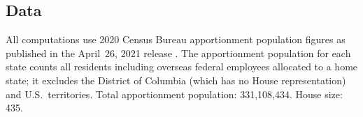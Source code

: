\subsection{Data}

All computations use 2020 Census Bureau apportionment population figures
as published in the April~26, 2021 release \citep{census2020apportionment}.
The apportionment population for each state counts all residents including
overseas federal employees allocated to a home state; it excludes the
District of Columbia (which has no House representation) and U.S.\ territories.
Total apportionment population: 331{,}108{,}434.
House size: 435.
